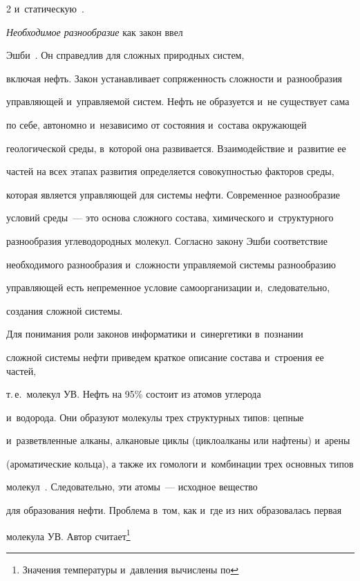 \begin{multicols}{2}
и~статическую~\cite{4-s}. 

    

    \textit{Необходимое разнообразие} как закон ввел  

Эшби~\cite[с.~202--216]{5-s}. Он справедлив для сложных природных систем, 

включая нефть. Закон уста\-нав\-ли\-ва\-ет сопряженность сложности и~разнообразия 

управляющей и~управляемой систем. Нефть не образуется и~не существует сама 

по себе, автономно и~независимо от состояния и~состава окружающей 

геологической среды, в~которой она развивается. Взаимодействие и~развитие ее 

частей на всех этапах развития определяется совокупностью факторов среды, 

которая является управ\-ля\-ющей для сис\-те\-мы нефти. Современное разнообразие 

условий среды~--- это основа слож\-но\-го со\-ста\-ва, химического и~структурного 

разнообразия углеводородных молекул. Согласно закону Эшби соответствие 

необходимого разнообразия и~сложности управ\-ля\-емой сис\-те\-мы разнообразию 

управляющей есть непременное условие самоорганизации и,~следовательно, 

создания слож\-ной сис\-темы.

    

    Для понимания роли законов информатики и~синергетики в~познании 

сложной системы нефти приведем краткое описание состава и~стро\-ения ее частей, 

т.\,е.\ молекул УВ. Нефть на 95\% со\-сто\-ит из атомов углерода 

и~водорода. Они образуют молекулы трех структурных типов: цепные 

и~разветвленные алканы, алкановые циклы (циклоалканы или нафтены) и~арены 

(ароматические кольца), а также их гомологи и~комбинации трех основных типов 

молекул~\cite[с.~34--175]{6-s}. Следовательно, эти атомы~--- исходное вещество 

для образования нефти. Проб\-ле\-ма в~том, как и~где из них образовалась первая 

молекула УВ. Автор считает\footnote{Значения температуры и~давления вычислены по 

}
\end{multicols}
